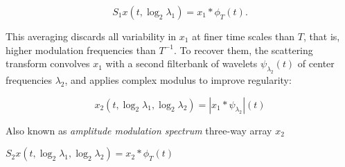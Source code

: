 \documentclass[twoside,a4paper]{article}
\begin{document}
\[
S_1 x (t, \log_2 \lambda_1) = x_1 \ast \phi_T (t).
\]

This averaging discards all variability in $x_1$ at finer time scales than $T$, that is, higher modulation frequencies than $T^{-1}$. To recover them, the scattering transform convolves $x_1$ with a second filterbank of wavelets $\psi_{\lambda_2}(t)$ of center frequencies $\lambda_2$, and applies complex modulus to improve regularity:

\[
x_2 (t, \log_2 \lambda_1, \log_2 \lambda_2) = \left| x_1 \ast \psi_{\lambda_{2}} \right| (t)
\]

Also known as \emph{amplitude modulation spectrum} three-way array $x_2$

$S_2 x (t, \log_2 \lambda_1, \log_2 \lambda_2) = x_2 \ast \phi_T (t)$



\nocite{*}

 
\end{document}
